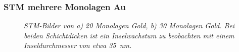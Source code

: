\documentclass{beamer}
\begin{document}
\begin{frame}
\frametitle{STM mehrere Monolagen Au}
\begin{figure}[H]
	\begin{minipage}[b]{0.45\textwidth} 
		
	\end{minipage}
	\hspace{0.5cm} 
	\begin{minipage}[b]{0.45\textwidth}
		
	\end{minipage}
	\caption{\textit{STM-Bilder von a) 20 Monolagen Gold, b) 30 Monolagen Gold. Bei beiden
	Schichtdicken ist ein Inselwachstum zu beobachten mit einem Inseldurchmesser von etwa \SI{35}{nm}.}}
\end{figure}
\end{frame}
\end{document}
